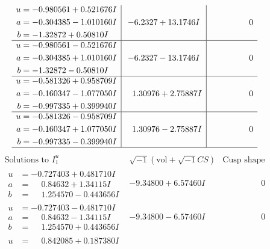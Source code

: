 \documentclass[1p]{elsarticle_modified}
\theoremstyle{definition}
\newcommand{\I}{\sqrt{-1}}
\begin{document}
$$\begin{array}{c|c|c}
\begin{aligned}
u &= -0.980561 + 0.521676 I \\
a &= -0.304385 - 1.010160 I \\
b &= -1.32872 + 0.50810 I\end{aligned}
 & -6.2327 + 13.1746 I & \phantom{-0.000000 } 0 \\ \hline\begin{aligned}
u &= -0.980561 - 0.521676 I \\
a &= -0.304385 + 1.010160 I \\
b &= -1.32872 - 0.50810 I\end{aligned}
 & -6.2327 - 13.1746 I & \phantom{-0.000000 } 0 \\ \hline\begin{aligned}
u &= -0.581326 + 0.958709 I \\
a &= -0.160347 - 1.077050 I \\
b &= -0.997335 + 0.399940 I\end{aligned}
 & \phantom{-}1.30976 + 2.75887 I & \phantom{-0.000000 } 0 \\ \hline\begin{aligned}
u &= -0.581326 - 0.958709 I \\
a &= -0.160347 + 1.077050 I \\
b &= -0.997335 - 0.399940 I\end{aligned}
 & \phantom{-}1.30976 - 2.75887 I & \phantom{-0.000000 } 0\\
 \hline 
 \end{array}$$\newpage$$\begin{array}{c|c|c}  
\text{Solutions to }I^u_{1}& \I (\text{vol} + \sqrt{-1}CS) & \text{Cusp shape}\\
 \hline 
\begin{aligned}
u &= -0.727403 + 0.481710 I \\
a &= \phantom{-}0.84632 + 1.34115 I \\
b &= \phantom{-}1.254570 - 0.443656 I\end{aligned}
 & -9.34800 + 6.57460 I & \phantom{-0.000000 } 0 \\ \hline\begin{aligned}
u &= -0.727403 - 0.481710 I \\
a &= \phantom{-}0.84632 - 1.34115 I \\
b &= \phantom{-}1.254570 + 0.443656 I\end{aligned}
 & -9.34800 - 6.57460 I & \phantom{-0.000000 } 0 \\ \hline\begin{aligned}
u &= \phantom{-}0.842085 + 0.187380 I \\

\end{aligned}
\end{array}$$
\end{document}
